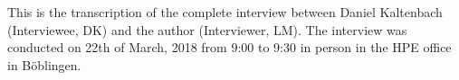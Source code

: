 

\label{anhang:InterviewDK}
This is the transcription of the complete interview between Daniel Kaltenbach (Interviewee, DK) and the author (Interviewer, LM). The interview was conducted on 22th of March, 2018 from 9:00 to 9:30 in person in the HPE office in Böblingen. 

